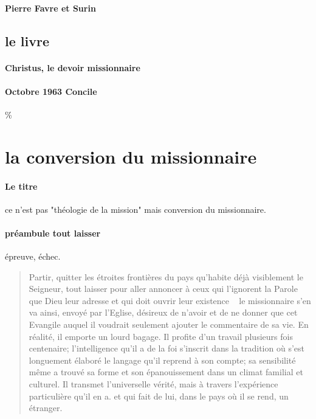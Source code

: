 \paragraph{Pierre Favre et Surin}
\subsection{le livre}

\paragraph{Christus, le devoir missionnaire}

\paragraph{Octobre 1963   Concile}



\%%
\section{la conversion du missionnaire}


\paragraph{Le titre} ce n'est pas "théologie de la mission" mais conversion du missionnaire.


\paragraph{préambule   tout laisser} épreuve, échec. 
\begin{quote}
    Partir, quitter les étroites frontières du pays qu'habite
déjà visiblement le Seigneur, tout laisser pour aller
annoncer à ceux qui l'ignorent la Parole que Dieu leur
 adresse et qui doit ouvrir leur existence ~ le missionnaire
s'en va ainsi, envoyé par l'Eglise, désireux de
n'avoir et de ne donner que cet Evangile auquel il voudrait
seulement ajouter le commentaire de sa vie.
En réalité, il emporte un lourd bagage. Il profite d'un
travail plusieurs fois centenaire; l'intelligence qu'il a
de la foi s'inscrit dans la tradition où s'est longuement
élaboré le langage qu'il reprend à son compte; sa sensibilité
même a trouvé sa forme et son épanouissement
dans un climat familial et culturel. Il transmet l'universelle
vérité, mais à travers l'expérience particulière qu'il
en a. et qui fait de lui, dans le pays où il se rend, un
étranger.
\end{quote}

